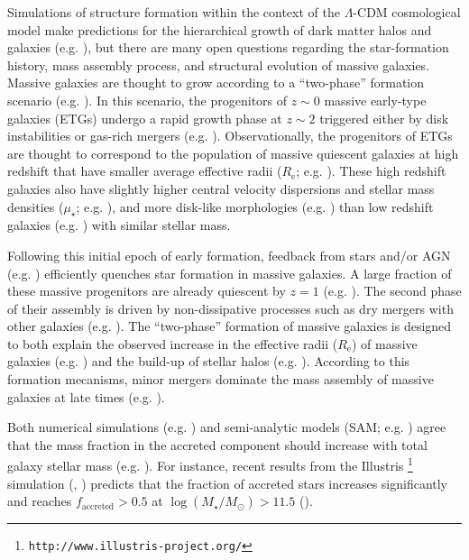 \documentclass[a4paper,fleqn,usenatbib]{mnras}
\def\logms{{$\log (M_{\star}/M_{\odot})$}}
\def\mden{{$\mu_{\star}$}}
\begin{document}
    Simulations of structure formation within the context of the $\Lambda$-CDM 
    cosmological model make predictions for the hierarchical growth of dark matter 
    halos and galaxies (e.g. \citealt{Baugh1996, DeLucia2006}), but there are many 
    open questions regarding the star-formation history, mass assembly process, and 
    structural evolution of massive galaxies. 
    Massive galaxies are thought to grow according to a ``two-phase'' formation 
    scenario (e.g. \citealt{Oser2010, Oser2012}). 
    In this scenario, the progenitors of $z{\sim} 0$ massive early-type galaxies 
    (ETGs) undergo a rapid growth phase at $z{\sim} 2$ triggered either by disk 
    instabilities or gas-rich mergers (e.g. \citealt{Hopkins2008, Dekel2009}). 
    Observationally, the progenitors of ETGs are thought to correspond to the 
    population of massive quiescent galaxies at high redshift that have smaller 
    average effective radii ($R_{\mathrm{e}}$; e.g. \citealt{Trujillo2006, 
    vanDokkum2008, Cimatti2008}).  These high redshift galaxies also have slightly higher central velocity dispersions and stellar mass densities (\mden{}; e.g. \citealt{vandeSande2011, Belli2014}), and 
    more disk-like morphologies (e.g. \citealt{vanderWel2011}) than low redshift galaxies (e.g. \citealt{Bezanson2009, vanDokkum2010}) with similar stellar 
    mass.
    
    Following this initial epoch of early formation, feedback from stars and/or AGN 
    (e.g. \citealt{Sijacki2007, Fabian2012}) efficiently quenches star formation in 
    massive galaxies. 
    A large fraction of these massive progenitors are already quiescent by $z=1$ 
    (e.g. \citealt{Bezanson2009, Kriek2016}). 
    The second phase of their assembly is driven by non-dissipative processes such 
    as dry mergers with other galaxies (e.g. \citealt{Naab2006, Khochfar2006}). The ``two-phase'' formation of massive galaxies is  designed to both explain the observed increase in the effective radii ($R_{\mathrm{e}}$) of massive galaxies (e.g. 
    \citealt{Newman2012, vdWel2014}) and the build-up of stellar 
    halos  (e.g. \citealt{Szomoru2012, Patel2013}). According to this formation mecanisms, minor mergers dominate the mass assembly of massive galaxies at late times (e.g. \citealt{Hilz2012, Hilz2013, Oogi2013, Bedorf2013, Laporte2013}).
    
    Both numerical simulations (e.g. \citealt{Oser2010}) and 
    semi-analytic models (SAM; e.g. \citealt{LeeYi2013, LeeYi2017}) agree that the 
    mass fraction in the accreted component should increase with total galaxy stellar mass (e.g. \citealt{Lackner2012, Cooper2013, 
    Qu2017}). For instance, recent results from the Illustris \footnote{
    \texttt{http://www.illustris-project.org/}} simulation 
    (\citealt{Vogelsberger2014}, \citealt{Genel2014}) predicts that the fraction of  
    accreted stars increases significantly and reaches $f_{\mathrm{accreted}}>0.5$ at \logms{}$>11.5$ (\citealt{RodriguezGomez2016}).
    
\end{document}
